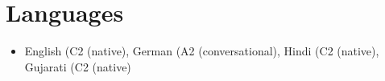 \documentclass[a4paper,10pt]{article}
\begin{document}
\section*{Languages}
\begin{itemize}
\item English (C2 (native), German (A2 (conversational), Hindi (C2 (native), Gujarati (C2 (native)
\end{itemize}
\end{document}
